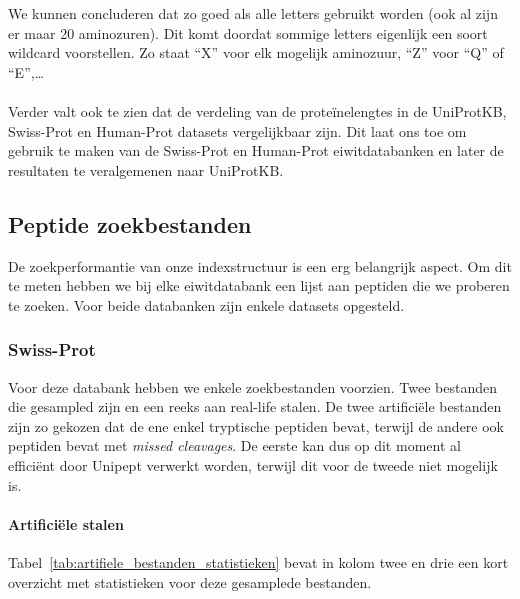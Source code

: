 We kunnen concluderen dat zo goed als alle letters gebruikt worden (ook al zijn er maar 20 aminozuren).
Dit komt doordat sommige letters eigenlijk een soort wildcard voorstellen.
Zo staat ``X'' voor elk mogelijk aminozuur, ``Z'' voor ``Q'' of ``E'',\ldots
\\ \\
Verder valt ook te zien dat de verdeling van de proteïnelengtes in de UniProtKB, Swiss-Prot en Human-Prot datasets vergelijkbaar zijn.
Dit laat ons toe om gebruik te maken van de Swiss-Prot en Human-Prot eiwitdatabanken en later de resultaten te veralgemenen naar UniProtKB\@.

\subsection{Peptide zoekbestanden}\label{subsec:peptide-zoek-bestanden}
De zoekperformantie van onze indexstructuur is een erg belangrijk aspect.
Om dit te meten hebben we bij elke eiwitdatabank een lijst aan peptiden die we proberen te zoeken.
Voor beide databanken zijn enkele datasets opgesteld.

\subsubsection{Swiss-Prot}
Voor deze databank hebben we enkele zoekbestanden voorzien.
Twee bestanden die gesampled zijn en een reeks aan real-life stalen.
De twee artificiële bestanden zijn zo gekozen dat de ene enkel tryptische peptiden bevat, terwijl de andere ook peptiden bevat met \textit{missed cleavages}.
De eerste kan dus op dit moment al efficiënt door Unipept verwerkt worden, terwijl dit voor de tweede niet mogelijk is.

\paragraph{Artificiële stalen}
Tabel~\ref{tab:artifiele_bestanden_statistieken} bevat in kolom twee en drie een kort overzicht met statistieken voor deze gesamplede bestanden.

